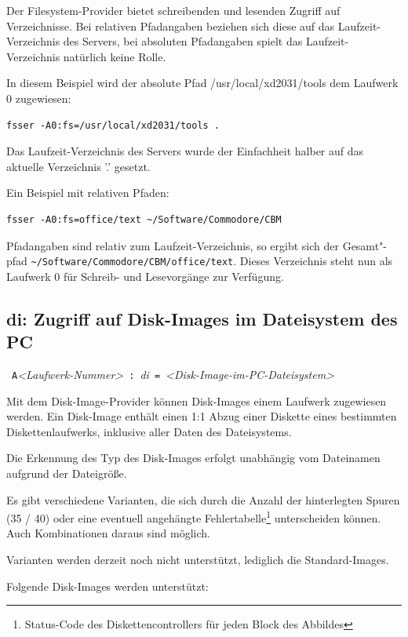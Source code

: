 \documentclass[10pt,a4paper]{scrartcl}		%
\begin{document}
Der Filesystem-Provider bietet schreibenden und lesenden Zugriff auf
Verzeichnisse. Bei relativen Pfadangaben beziehen sich diese
auf das Laufzeit-Verzeichnis des Servers, bei absoluten Pfadangaben
spielt das Laufzeit-Verzeichnis natürlich keine Rolle.

In diesem Beispiel wird der absolute Pfad /usr/local/xd2031/tools
dem Laufwerk 0 zugewiesen:

\begin{verbatim}
fsser -A0:fs=/usr/local/xd2031/tools .
\end{verbatim}

Das Laufzeit-Verzeichnis des Servers wurde der Einfachheit halber
auf das aktuelle Verzeichnis '.' gesetzt.

Ein Beispiel mit relativen Pfaden:

\begin{verbatim}
fsser -A0:fs=office/text ~/Software/Commodore/CBM
\end{verbatim}

Pfadangaben sind relativ zum Laufzeit-Verzeichnis, 
so ergibt sich der Gesamt"-pfad  
\texttt{\~{}/Software/Commodore/CBM/office/text}.
Dieses Verzeichnis steht nun als Laufwerk 0 
für Schreib- und Lesevorgänge zur Verfügung.

\subsection{di: Zugriff auf Disk-Images im Dateisystem des PC}
\mbox{ \texttt{A}\textit{<Laufwerk-Nummer>} 
\texttt{:} \textit{di} \texttt{=}
\textit{<Disk-Image-im-PC-Dateisystem>} }

Mit dem Disk-Image-Provider können Disk-Images einem
Laufwerk zugewiesen werden. Ein Disk-Image enthält einen 1:1 Abzug
einer Diskette eines bestimmten Diskettenlaufwerks, inklusive
aller Daten des Dateisystems.

Die Erkennung des Typ des Disk-Images erfolgt unabhängig vom 
Dateinamen aufgrund der Dateigröße. 

Es gibt verschiedene Varianten, die sich durch die Anzahl
der hinterlegten Spuren (35 / 40) oder eine eventuell 
angehängte 
Fehlertabelle\footnote{Status-Code des Diskettencontrollers für 
jeden Block des Abbildes} 
unterscheiden können. Auch Kombinationen daraus sind möglich.

Varianten werden derzeit noch nicht unterstützt, lediglich die
Standard-Images.

Folgende Disk-Images werden unterstützt:
\end{document}
